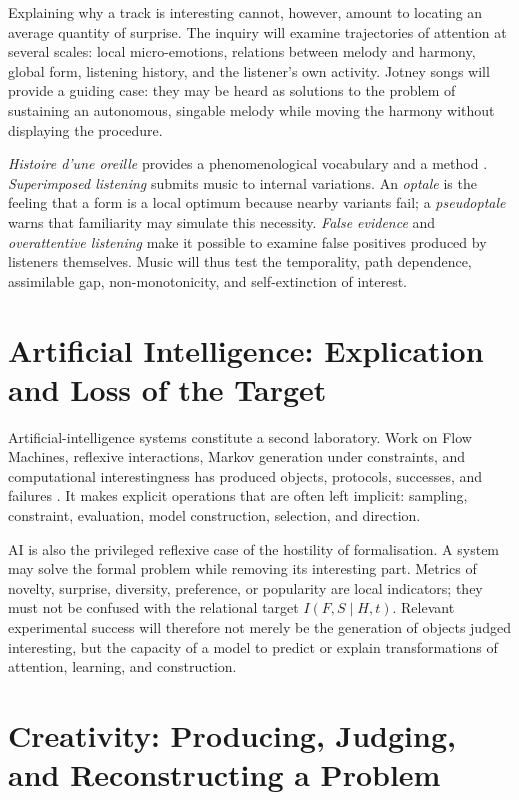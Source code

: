 \documentclass[11pt,a4paper]{article}
\begin{document}
Explaining why a track is interesting cannot, however, amount to locating an
average quantity of surprise. The inquiry will examine trajectories of
attention at several scales: local micro-emotions, relations between melody and
harmony, global form, listening history, and the listener's own activity.
Jotney songs will provide a guiding case: they may be heard as solutions to the
problem of sustaining an autonomous, singable melody while moving the harmony
without displaying the procedure.

\emph{Histoire d'une oreille} provides a phenomenological vocabulary and a
method \parencite{pachet2018oreille}. \emph{Superimposed listening} submits
music to internal variations. An \emph{optale} is the feeling that a form is a
local optimum because nearby variants fail; a \emph{pseudoptale} warns that
familiarity may simulate this necessity. \emph{False evidence} and
\emph{overattentive listening} make it possible to examine false positives
produced by listeners themselves. Music will thus test the temporality, path
dependence, assimilable gap, non-monotonicity, and self-extinction of interest.

\section{Artificial Intelligence: Explication and Loss of the Target}

Artificial-intelligence systems constitute a second laboratory. Work on Flow
Machines, reflexive interactions, Markov generation under constraints, and
computational interestingness has produced objects, protocols, successes, and
failures
\parencite{pachet2006clefs,pachet2008machines,pachet2012virtuosity,pachet2021assisted,pachet2026markov}.
It makes explicit operations that are often left implicit: sampling,
constraint, evaluation, model construction, selection, and direction.

AI is also the privileged reflexive case of the hostility of formalisation. A
system may solve the formal problem while removing its interesting part.
Metrics of novelty, surprise, diversity, preference, or popularity are local
indicators; they must not be confused with the relational target
\(I(F,S\mid H,t)\). Relevant experimental success will therefore not merely be
the generation of objects judged interesting, but the capacity of a model to
predict or explain transformations of attention, learning, and construction.

\section{Creativity: Producing, Judging, and Reconstructing a Problem}
\end{document}
